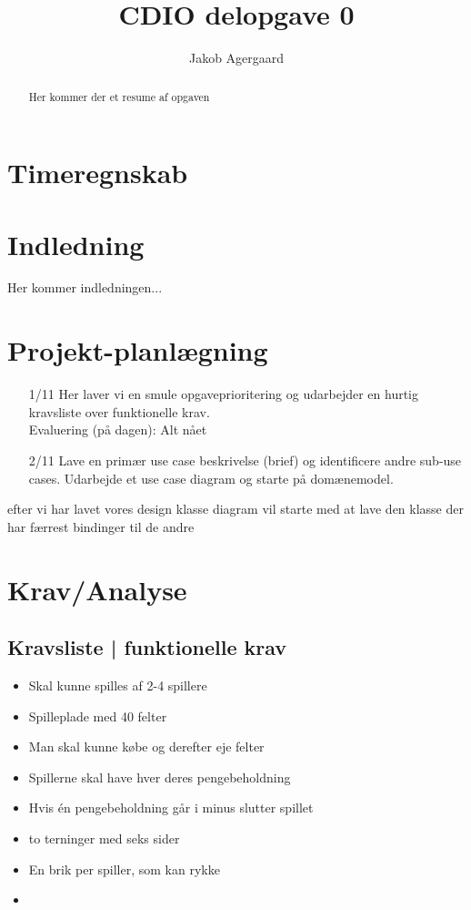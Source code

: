 \documentclass{article}
\title{CDIO delopgave 0}
\author{Jakob Agergaard}
\begin{document}
\titlespacing{\section}
    {0pt}{2em}{1em}



\normalsize
\begin{abstract}
     Her kommer der et resume af opgaven
\end{abstract}

\tableofcontents

\section{Timeregnskab}

\section{Indledning}

Her kommer indledningen...

\section{Projekt-planlægning}
\begin{itemize}
    \item [1/11] Her laver vi en smule opgaveprioritering og udarbejder en hurtig kravsliste over funktionelle krav.\\
    Evaluering (på dagen): Alt nået \\
    \item [2/11] Lave en primær use case beskrivelse (brief) og identificere andre sub-use cases. Udarbejde et use case diagram og starte på domænemodel.
\end{itemize}
efter vi har lavet vores design klasse diagram vil starte med at lave den klasse der har færrest bindinger til de andre 


\section{Krav/Analyse}
\subsection{Kravsliste | funktionelle krav}
\begin{itemize}
    \item Skal kunne spilles af 2-4 spillere
    \item Spilleplade med 40 felter
    \item Man skal kunne købe og derefter eje felter
    \item Spillerne skal have hver deres pengebeholdning
    \item Hvis én pengebeholdning går i minus slutter spillet
    \item to terninger med seks sider
    \item En brik per spiller, som kan rykke
    \item 
\end{itemize}
\end{document}
